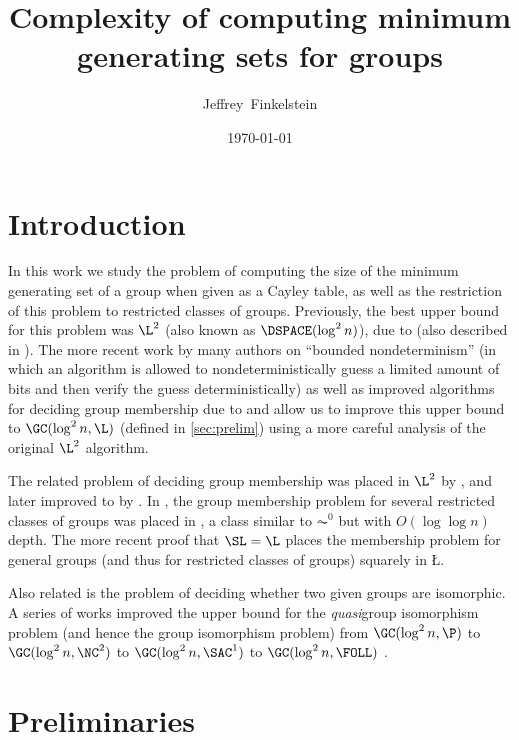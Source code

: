\documentclass{article}
\title{Complexity of computing minimum generating sets for groups}
\author{Jef{}frey~Finkelstein}
\date{\today}
\begin{document}
\maketitle

\section{Introduction}

In this work we study the problem of computing the size of the minimum generating set of a group when given as a Cayley table, as well as the restriction of this problem to restricted classes of groups.
Previously, the best upper bound for this problem was $\L^2$ (also known as $\DSPACE(\log^2 n)$), due to \cite{lsz77} (also described in \cite[Proposition~3]{at06}).
The more recent work by many authors on ``bounded nondeterminism'' (in which an algorithm is allowed to nondeterministically guess a limited amount of bits and then verify the guess deterministically) as well as improved algorithms for deciding group membership due to \cite{bm89} and \cite{bklm01} allow us to improve this upper bound to $\GC(\log^2 n, \L)$ (defined in \autoref{sec:prelim}) using a more careful analysis of the original $\L^2$ algorithm.

The related problem of deciding group membership was placed in $\L^2$ by \cite{lsz77}, and later improved to \SL{} by \cite{bm89}.
In \cite{bklm01}, the group membership problem for several restricted classes of groups was placed in \FOLL, a class similar to $\AC^0$ but with $O(\log \log n)$ depth.
The more recent proof that $\SL = \L$ \cite{reingold08} places the membership problem for general groups (and thus for restricted classes of groups) squarely in \L.

Also related is the problem of deciding whether two given groups are isomorphic.
A series of works improved the upper bound for the \emph{quasi}group isomorphism problem (and hence the group isomorphism problem) from $\GC(\log^2 n, \P)$ \cite{py96} to $\GC(\log^2 n, \NC^2)$ \cite{wolf94} to $\GC(\log^2 n, \SAC^1)$ \cite{wagner10} to $\GC(\log^2 n, \FOLL)$ \cite{ctw10}.

\section{Preliminaries}\label{sec:prelim}
\end{document}
